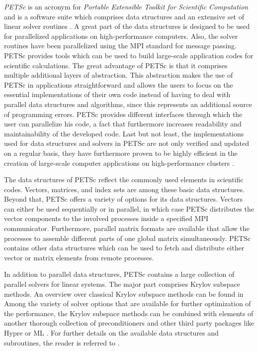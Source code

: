 \emph{PETSc} is an acronym for \emph{Portable Extensible Toolkit for Scientific Computation} and is a software suite which comprises data structures and an extensive set of linear solver routines \cite{petsc-web-page,petsc-efficient}. A great part of the data structures is designed to be used for parallelized applications on high-performance computers. Also, the solver routines have been parallelized using the MPI standard for message passing. PETSc provides tools which can be used to build large-scale application codes for scientific calculations. The great advantage of PETSc is that it comprises multiple additional layers of abstraction. This abstraction makes the use of PETSc in applications straightforward and allows the users to focus on the essential implementations of their own code instead of having to deal with parallel data structures and algorithms, since this represents an additional source of programming errors. PETSc provides different interfaces through which the user can parallelize his code, a fact that furthermore increases readability and maintainability of the developed code. Last but not least, the implementations used for data structures and solvers in PETSc are not only verified and updated on a regular basis, they have furthermore proven to be highly efficient in the creation of large-scale computer applications on high-performance clusters \cite{bonfiglioli12,gropp00,karimian05}.

The data structures of PETSc reflect the commonly used elements in scientific codes. Vectors, matrices, and index sets are among these basic data structures. Beyond that, PETSc offers a variety of options for its data structures. Vectors can either be used sequentially or in parallel, in which case PETSc distributes the vector components to the involved processes inside a specified MPI communicator. Furthermore, parallel matrix formats are available that allow the processes to assemble different parts of one global matrix simultaneously. PETSc contains other data structures which can be used to fetch and distribute either vector or matrix elements from remote processes.

In addition to parallel data structures, PETSc contains a large collection of parallel solvers for linear systems. The major part comprises Krylov subspace methods. An overview over classical Krylov subspace methods can be found in \cite{saad03} Among the variety of solver options that are available for further optimization of the performance, the Krylov subspace methods can be combined with elements of another thorough collection of preconditioners and other third party packages like Hypre \cite{hypre} or ML \cite{ml}. For further details on the available data structures and subroutines, the reader is referred to \cite{petsc-user-ref,petsc-web-page}.

